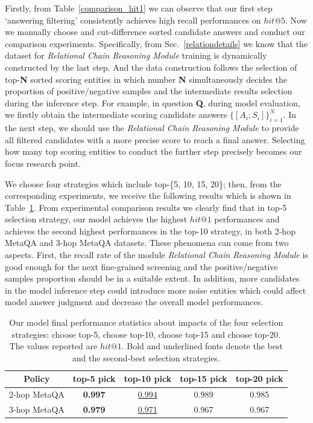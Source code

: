 \documentclass[pdflatex,sn-mathphys]{sn-jnl}%
\theoremstyle{thmstyleone}%
\theoremstyle{thmstyletwo}%
\theoremstyle{thmstylethree}%
\begin{document}
Firstly, from Table~\ref{comparison_hit1} we can observe that our first step `answering filtering' consistently achieves high recall performances on $hit@5$. Now we manually choose and cut-difference sorted candidate answers and conduct our comparison experiments. Specifically, from Sec.~\ref{relationdetails} we know that the dataset for \textit{Relational Chain Reasoning Module} training is dynamically constructed by the last step. And the data construction follows the selection of top-\textbf{N} sorted scoring entities in which number \textbf{N} simultaneously decides the proportion of positive/negative samples and the intermediate results selection during the inference step. For example, in question \textbf{Q}, during model evaluation, we firstly obtain the intermediate scoring candidate answers $\{[A_{i};S_{i}]\}_{i=1}^{N}$. In the next step, we should use the \textit{Relational Chain Reasoning Module} to provide all filtered candidates with a more precise score to reach a final answer. Selecting how many top scoring entities to conduct the further step precisely becomes our focus research point.

We choose four strategies which include top-\{5, 10, 15, 20\}; then, from the corresponding experiments, we receive the following results which is shown in Table~\ref{topselectionpolicy}. From experimental comparison results we clearly find that in top-5 selection strategy, our model achieves the highest $hit@1$ performances and achieves the second highest performances in the top-10 strategy, in both 2-hop MetaQA and 3-hop MetaQA datasets. These phenomena can come from two aspects. First, the recall rate of the module \textit{Relational Chain Reasoning Module} is good enough for the next fine-grained screening and the positive/negative samples proportion should be in a suitable extent. In addition, more candidates in the model inference step could introduce more noise entities which could affect model answer judgment and decrease the overall model performances.

\begin{table}[h]
    \centering
    \begin{tabular}{c|c|c|c|c} \hline
        Policy & top-5 pick & top-10 pick & top-15 pick & top-20 pick \\ \hline
        2-hop MetaQA  & \textbf{0.997} & \underline{0.994} & 0.989 & 0.985 \\
        3-hop MetaQA  & \textbf{0.979} & \underline{0.971} & 0.967 & 0.967 \\ \hline
    \end{tabular}
    \caption{Our model final performance statistics about impacts of the four selection strategies: choose top-5, choose top-10, choose top-15 and choose top-20. The values reported are $hit@1$. Bold and underlined fonts denote the best and the second-best selection strategies.}
    \label{topselectionpolicy}
\end{table}
\end{document}
